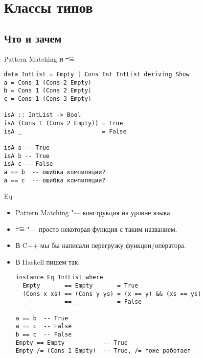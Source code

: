 \section{Классы типов}
\subsection{Что и зачем}

\begin{frame}
\end{frame}

\begin{frame}[fragile]{Pattern Matching и \t{==}}
\begin{verbatim}
data IntList = Empty | Cons Int IntList deriving Show
a = Cons 1 (Cons 2 Empty)
b = Cons 1 (Cons 2 Empty)
c = Cons 1 (Cons 3 Empty)

isA :: IntList -> Bool
isA (Cons 1 (Cons 2 Empty)) = True
isA _                       = False

isA a -- True
isA b -- True
isA c -- False
a == b  -- ошибка компиляции?
a == c  -- ошибка компиляции?
\end{verbatim}
\end{frame}

\begin{frame}[fragile]{Eq}
	\begin{itemize}
		\item Pattern Matching "--- конструкция на уровне языка.
		\item \t{==} "--- просто некоторая функция с таким названием.
		\item В C++ мы бы написали перегрузку функции/оператора.
		\item В Haskell пишем так:
\begin{verbatim}
instance Eq IntList where
  Empty       == Empty       = True
  (Cons x xs) == (Cons y ys) = (x == y) && (xs == ys)
  _           == _           = False

a == b  -- True
a == c  -- False
b == c  -- False
Empty == Empty           -- True
Empty /= (Cons 1 Empty)  -- True, /= тоже работает
\end{verbatim}
	\end{itemize}
\end{frame}

